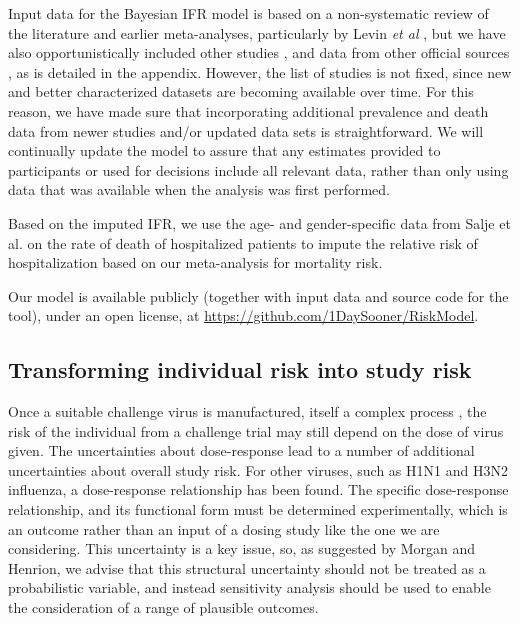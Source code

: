 \documentclass{article}
\begin{document}
Input data for the Bayesian IFR model is based on a non-systematic review of the literature and earlier meta-analyses, particularly by Levin \textit{et al} \cite{levin2020assessing}, but we have also opportunistically included other studies %
, and data from other official sources
, as is detailed in the appendix. However, the list of studies is not fixed, since new and better characterized datasets are becoming available over time. For this reason, we have made sure that incorporating additional prevalence and death data from newer studies and/or updated data sets is straightforward. We will continually update the model to assure that any estimates provided to participants or used for decisions include all relevant data, rather than only using data that was available when the analysis was first performed.

Based on the imputed IFR, we use the age- and gender-specific data from Salje et al. \cite{Salje208} on the rate of death of hospitalized patients to impute the relative risk of hospitalization based on our meta-analysis for mortality risk.

Our model is available publicly (together with input data and source code for the tool), under an open license, at \url{https://github.com/1DaySooner/RiskModel}.

\subsection{Transforming individual risk into study risk}

Once a suitable challenge virus is manufactured, itself a complex process \cite{catchpole2018manufacturing}, the risk of the individual from a challenge trial may still depend on the dose of virus given. The uncertainties about dose-response lead to a number of additional uncertainties about overall study risk. For other viruses, such as H1N1 and H3N2 influenza, a dose-response relationship has been found\cite{memoli2015validation, han2019dose}. The specific dose-response relationship, and its functional form must be determined experimentally, which is an outcome rather than an input of a dosing study like the one we are considering. This uncertainty is a key issue, so, as suggested by Morgan and Henrion\cite{morgan1990uncertainty}, we advise that this structural uncertainty should not be treated as a probabilistic variable, and instead sensitivity analysis should be used to enable the consideration of a range of plausible outcomes.
\end{document}

